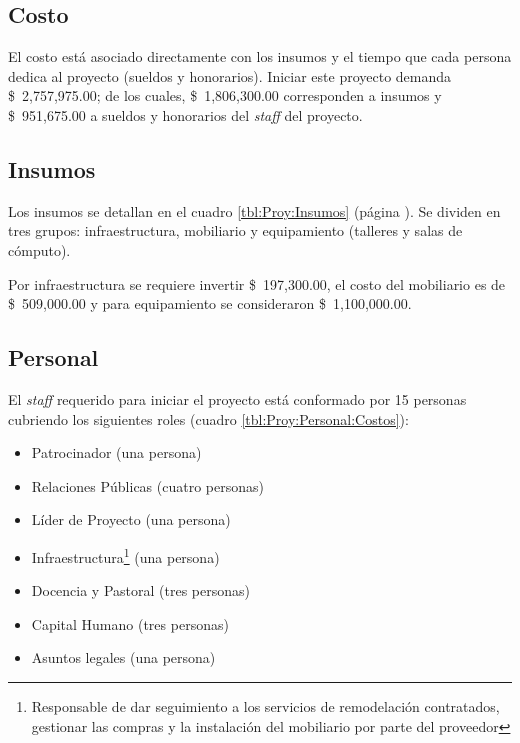 \subsection{Costo}
\label{sub:Proy:Costo}

El costo está asociado directamente con los insumos y el tiempo que cada persona dedica al proyecto (sueldos y honorarios). Iniciar este proyecto demanda \$~2,757,975.00; de los cuales, \$~1,806,300.00 corresponden a insumos y \$~951,675.00 a sueldos y honorarios del \emph{staff} del proyecto.

\subsection{Insumos}

Los insumos se detallan en el cuadro \ref{tbl:Proy:Insumos} (página \pageref{tbl:Proy:Insumos}). Se dividen en tres grupos: infraestructura, mobiliario y equipamiento (talleres y salas de cómputo).

Por infraestructura se requiere invertir \$~197,300.00, el costo del mobiliario es de \$~509,000.00 y para equipamiento se consideraron \$~1,100,000.00.

\subsection{Personal}

El \emph{staff} requerido para iniciar el proyecto está conformado por 15 personas cubriendo los siguientes roles (cuadro \ref{tbl:Proy:Personal:Costos}):

\begin{itemize}
	\item Patrocinador (una persona)
	\item Relaciones Públicas (cuatro personas)
	\item Líder de Proyecto (una persona)
	\item Infraestructura\footnote{Responsable de dar seguimiento a los servicios de remodelación contratados, gestionar las compras y la instalación del mobiliario por parte del proveedor} (una persona)
	\item Docencia y Pastoral (tres personas)
	\item Capital Humano (tres personas)
	\item Asuntos legales (una persona)
\end{itemize}

\clearpage



